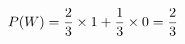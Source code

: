 \documentclass[preview]{standalone}
\begin{document}
\begin{align*}
\special{dvisvgm:raw <g id='unique000'>}P(W)=\dfrac{2}{3}\times 1+\dfrac{1}{3}\times 0=\dfrac{2}{3}\special{dvisvgm:raw </g>}
\end{align*}
\end{document}
